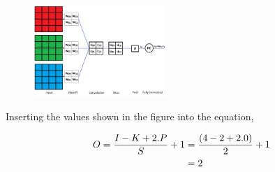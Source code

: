 \begin{vbframe}
 \begin{figure}
    \centering
    \includegraphics[width=5cm]{figure/3channel.png}
  \end{figure}

Inserting the values shown in the figure into the equation,

\begin{align} 
O= \frac{I - K + 2.P}{S} + 1&={(4 - 2 + 2.0)\over 2} + 1\\ 
&=2 
\end{align}

\end{vbframe}



\endlecture
